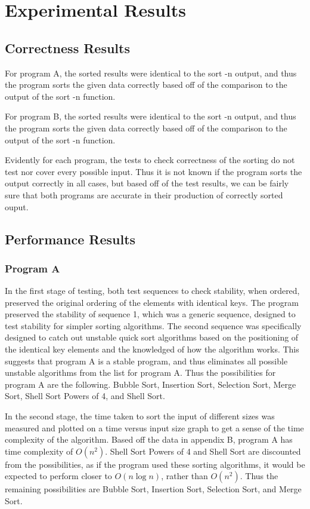 \documentclass[a4paper]{article}
\newcommand{\ds}{\displaystyle}
\begin{document}
\pagebreak

\section{Experimental Results}

\subsection{Correctness Results}
For program A, the sorted results were identical to the sort -n output, and thus the program sorts the given data correctly based off of the comparison to the output of the sort -n function.

For program B, the sorted results were identical to the sort -n output, and thus the program sorts the given data correctly based off of the comparison to the output of the sort -n function.

\bigbreak

Evidently for each program, the tests to check correctness of the sorting do not test nor cover every possible input. Thus it is not known if the program sorts the output correctly in all cases, but based off of the test results, we can be fairly sure that both programs are accurate in their production of correctly sorted ouput.

\subsection{Performance Results}
\subsubsection{Program A}
In the first stage of testing, both test sequences to check stability, when ordered, preserved the original ordering of the elements with identical keys. The program preserved the stability of sequence 1, which was a generic sequence, designed to test stability for simpler sorting algorithms. The second sequence was specifically designed to catch out unstable quick sort algorithms based on the positioning of the identical key elements and the knowledged of how the algorithm works. This suggests that program A is a stable program, and thus eliminates all possible unstable algorithms from the list for program A. Thus the possibilities for program A are the following. Bubble Sort, Insertion Sort, Selection Sort, Merge Sort, Shell Sort Powers of 4, and Shell Sort.

In the second stage, the time taken to sort the input of different sizes was measured and plotted on a time versus input size graph to get a sense of the time complexity of the algorithm. Based off the data in appendix B, program A has time complexity of $\ds{O(n^2)}$. Shell Sort Powers of 4 and Shell Sort are discounted from the possibilities, as if the program used these sorting algorithms, it would be expected to perform closer to $\ds{O(n\log{n})}$, rather than $\ds{O(n^2)}$. Thus the remaining possibilities are Bubble Sort, Insertion Sort, Selection Sort, and Merge Sort.
\end{document}
